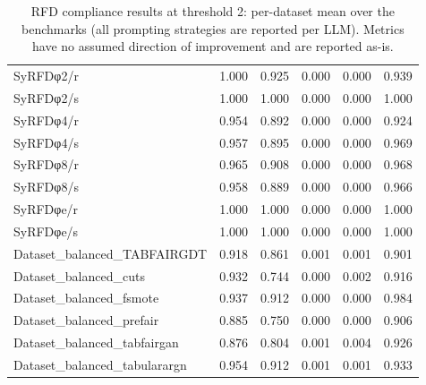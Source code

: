 \begin{table}[t]
\begin{tabular}{lrrrrr}
\midrule
SyRFDφ2/r & 1.000 & 0.925 & 0.000 & 0.000 & 0.939 \\
SyRFDφ2/s & 1.000 & 1.000 & 0.000 & 0.000 & 1.000 \\
SyRFDφ4/r & 0.954 & 0.892 & 0.000 & 0.000 & 0.924 \\
SyRFDφ4/s & 0.957 & 0.895 & 0.000 & 0.000 & 0.969 \\
SyRFDφ8/r & 0.965 & 0.908 & 0.000 & 0.000 & 0.968 \\
SyRFDφ8/s & 0.958 & 0.889 & 0.000 & 0.000 & 0.966 \\
SyRFDφe/r & 1.000 & 1.000 & 0.000 & 0.000 & 1.000 \\
SyRFDφe/s & 1.000 & 1.000 & 0.000 & 0.000 & 1.000 \\
\midrule
Dataset\_balanced\_TABFAIRGDT & 0.918 & 0.861 & 0.001 & 0.001 & 0.901 \\
Dataset\_balanced\_cuts & 0.932 & 0.744 & 0.000 & 0.002 & 0.916 \\
Dataset\_balanced\_fsmote & 0.937 & 0.912 & 0.000 & 0.000 & 0.984 \\
Dataset\_balanced\_prefair & 0.885 & 0.750 & 0.000 & 0.000 & 0.906 \\
Dataset\_balanced\_tabfairgan & 0.876 & 0.804 & 0.001 & 0.004 & 0.926 \\
Dataset\_balanced\_tabularargn & 0.954 & 0.912 & 0.001 & 0.001 & 0.933 \\
\bottomrule
\end{tabular}
\caption{RFD compliance results at threshold 2: per-dataset mean over the benchmarks (all prompting strategies are reported per LLM). Metrics have no assumed direction of improvement and are reported as-is.}
\label{tab:rfdcompliance_main_thr2}
\end{table}